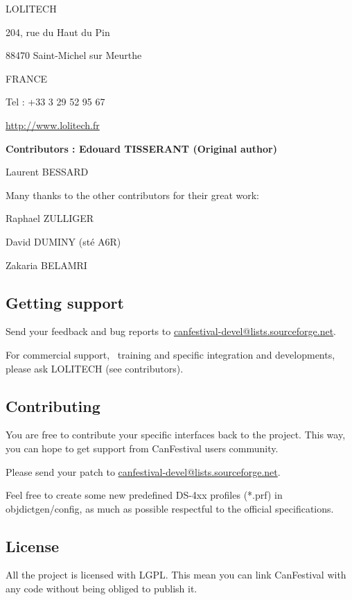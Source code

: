 \documentclass[12pt,twoside]{article}
\begin{document}
LOLITECH

204, rue du Haut du Pin

88470 Saint{}-Michel sur Meurthe

FRANCE

Tel : +33 3 29 52 95 67

\href{http://www.lolitech.fr/}{http://www.lolitech.fr}

{\bfseries
Contributors : \textmd{Edouard TISSERANT (Original author)}}

{\mdseries
   Laurent BESSARD}


\bigskip

Many thanks to the other contributors for their great work:

\textmd{   }Raphael ZULLIGER

\textmd{   }David DUMINY (st\'e A6R)

\textmd{   }Zakaria BELAMRI

\subsection{Getting support}
Send your feedback and bug reports to
\href{mailto:canfestival-devel@lists.sourceforge.net}{canfestival{}-devel@lists.sourceforge.net}.

For commercial support, \ training and specific integration and
developments, please ask LOLITECH (see contributors).

\subsection{Contributing}
You are free to contribute your specific interfaces back to the project.
This way, you can hope to get support from CanFestival users community.

Please send your patch to
\href{mailto:canfestival-devel@lists.sourceforge.net}{canfestival{}-devel@lists.sourceforge.net}.

Feel free to create some new predefined DS{}-4xx profiles (*.prf) in
objdictgen/config, as much as possible respectful to the official
specifications.

\subsection{License}
All the project is licensed with LGPL. This mean you can link
CanFestival with any code without being obliged to publish it.
\end{document}
